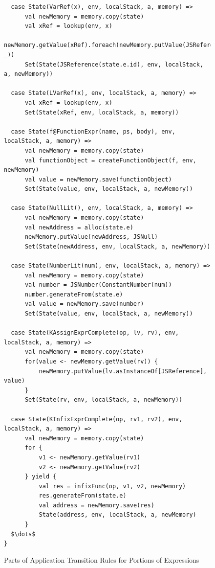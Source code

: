 \documentclass{article}
\begin{document}
\begin{figure}
\lstset{language=Scala, mathescape}
\begin{lstlisting}
  case State(VarRef(x), env, localStack, a, memory) =>
      val newMemory = memory.copy(state)
      val xRef = lookup(env, x)
      newMemory.getValue(xRef).foreach(newMemory.putValue(JSReference(state.e.id), _))
      Set(State(JSReference(state.e.id), env, localStack, a, newMemory))

  case State(LVarRef(x), env, localStack, a, memory) =>
      val xRef = lookup(env, x)
      Set(State(xRef, env, localStack, a, memory))

  case State(f@FunctionExpr(name, ps, body), env, localStack, a, memory) =>
      val newMemory = memory.copy(state)
      val functionObject = createFunctionObject(f, env, newMemory)
      val value = newMemory.save(functionObject)
      Set(State(value, env, localStack, a, newMemory))

  case State(NullLit(), env, localStack, a, memory) =>
      val newMemory = memory.copy(state)
      val newAddress = alloc(state.e)
      newMemory.putValue(newAddress, JSNull)
      Set(State(newAddress, env, localStack, a, newMemory))

  case State(NumberLit(num), env, localStack, a, memory) =>
      val newMemory = memory.copy(state)
      val number = JSNumber(ConstantNumber(num))
      number.generateFrom(state.e)
      val value = newMemory.save(number)
      Set(State(value, env, localStack, a, newMemory))

  case State(KAssignExprComplete(op, lv, rv), env, localStack, a, memory) =>
      val newMemory = memory.copy(state)
      for(value <- newMemory.getValue(rv)) {
          newMemory.putValue(lv.asInstanceOf[JSReference], value)
      }
      Set(State(rv, env, localStack, a, newMemory))

  case State(KInfixExprComplete(op, rv1, rv2), env, localStack, a, memory) =>
      val newMemory = memory.copy(state)
      for {
          v1 <- newMemory.getValue(rv1)
          v2 <- newMemory.getValue(rv2)
      } yield {
          val res = infixFunc(op, v1, v2, newMemory)
          res.generateFrom(state.e)
          val address = newMemory.save(res)
          State(address, env, localStack, a, newMemory)
      }
  $\dots$
}
\end{lstlisting}
\caption{Parts of Application Transition Rules for Portions of Expressions}
\label{fig:app-expr}
\end{figure}
\end{document}
